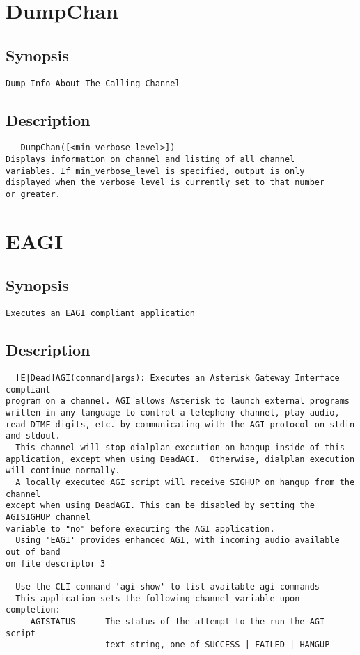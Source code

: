 \section{DumpChan}
\subsection{Synopsis}
\begin{verbatim}
Dump Info About The Calling Channel
\end{verbatim}
\subsection{Description}
\begin{verbatim}
   DumpChan([<min_verbose_level>])
Displays information on channel and listing of all channel
variables. If min_verbose_level is specified, output is only
displayed when the verbose level is currently set to that number
or greater. 

\end{verbatim}


\section{EAGI}
\subsection{Synopsis}
\begin{verbatim}
Executes an EAGI compliant application
\end{verbatim}
\subsection{Description}
\begin{verbatim}
  [E|Dead]AGI(command|args): Executes an Asterisk Gateway Interface compliant
program on a channel. AGI allows Asterisk to launch external programs
written in any language to control a telephony channel, play audio,
read DTMF digits, etc. by communicating with the AGI protocol on stdin
and stdout.
  This channel will stop dialplan execution on hangup inside of this
application, except when using DeadAGI.  Otherwise, dialplan execution
will continue normally.
  A locally executed AGI script will receive SIGHUP on hangup from the channel
except when using DeadAGI. This can be disabled by setting the AGISIGHUP channel
variable to "no" before executing the AGI application.
  Using 'EAGI' provides enhanced AGI, with incoming audio available out of band
on file descriptor 3

  Use the CLI command 'agi show' to list available agi commands
  This application sets the following channel variable upon completion:
     AGISTATUS      The status of the attempt to the run the AGI script
                    text string, one of SUCCESS | FAILED | HANGUP

\end{verbatim}


